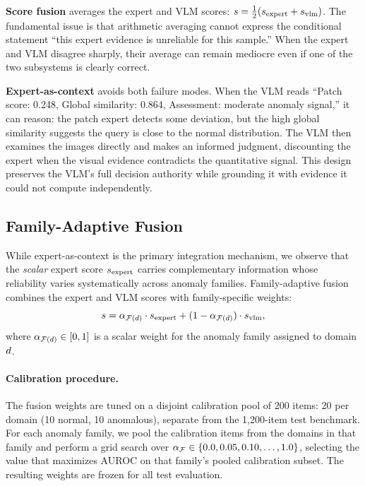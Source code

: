 \textbf{Score fusion} averages the expert and VLM scores: $s = \frac{1}{2}(s_{\text{expert}} + s_{\text{vlm}})$.
The fundamental issue is that arithmetic averaging cannot express the conditional statement ``this expert evidence is unreliable for this sample.''
When the expert and VLM disagree sharply, their average can remain mediocre even if one of the two subsystems is clearly correct.

\textbf{Expert-as-context} avoids both failure modes.
When the VLM reads ``Patch score: 0.248, Global similarity: 0.864, Assessment: moderate anomaly signal,'' it can reason: the patch expert detects some deviation, but the high global similarity suggests the query is close to the normal distribution.
The VLM then examines the images directly and makes an informed judgment, discounting the expert when the visual evidence contradicts the quantitative signal.
This design preserves the VLM's full decision authority while grounding it with evidence it could not compute independently.

\subsection{Family-Adaptive Fusion}
\label{sec:fusion}

While expert-as-context is the primary integration mechanism, we observe that the \emph{scalar} expert score $s_{\text{expert}}$ carries complementary information whose reliability varies systematically across anomaly families.
Family-adaptive fusion combines the expert and VLM scores with family-specific weights:
\begin{equation}
    s = \alpha_{\mathcal{F}(d)} \cdot s_{\text{expert}} + (1 - \alpha_{\mathcal{F}(d)}) \cdot s_{\text{vlm}},
    \label{eq:fusion}
\end{equation}
where $\alpha_{\mathcal{F}(d)} \in [0,1]$ is a scalar weight for the anomaly family assigned to domain $d$.

\paragraph{Calibration procedure.}
The fusion weights are tuned on a disjoint calibration pool of 200 items: 20 per domain (10 normal, 10 anomalous), separate from the 1{,}200-item test benchmark.
For each anomaly family, we pool the calibration items from the domains in that family and perform a grid search over $\alpha_{\mathcal{F}} \in \{0.0, 0.05, 0.10, \ldots, 1.0\}$, selecting the value that maximizes AUROC on that family's pooled calibration subset.
The resulting weights are frozen for all test evaluation.

